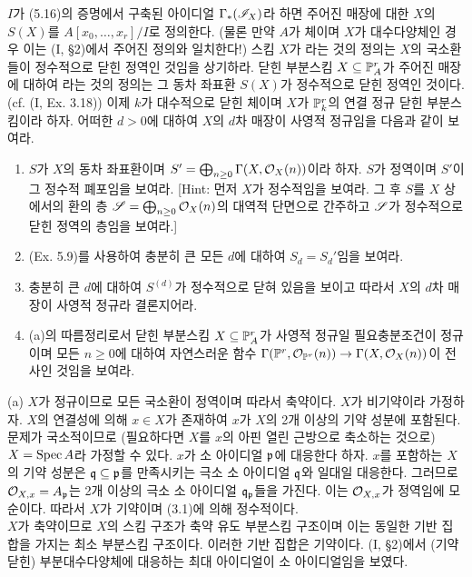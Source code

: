 \begin{enumerate}[label=\tb{5.\arabic*.},itemindent=0mm,itemsep=4mm]
	$I$가 (5.16)의 증명에서 구축된 아이디얼 $\Gamma_*(\mathscr{I}_X)$라 하면
	주어진 매장에 대한 $X$의  $S(X)$를 $A[x_0,\ldots,x_r]/I$로 정의한다.
	(물론 만약 $A$가 체이며 $X$가 대수다양체인 경우 이는 (I, \S 2)에서 주어진 정의와 일치한다!)
	스킴 $X$가 라는 것의 정의는 $X$의 국소환들이 정수적으로 닫힌 정역인 것임을 상기하라.
	닫힌 부분스킴 $X\subseteq\mathbb{P}^r_A$가 주어진 매장에 대하여 라는 것의 정의는
	그 동차 좌표환 $S(X)$가 정수적으로 닫힌 정역인 것이다. (cf. (I, Ex. 3.18))
	이제 $k$가 대수적으로 닫힌 체이며 $X$가 $\mathbb{P}^r_k$의 연결 정규 닫힌 부분스킴이라 하자.
	어떠한 $d>0$에 대하여 $X$의 $d$차 매장이 사영적 정규임을 다음과 같이 보여라.
	\begin{enumerate}[label=(\alph*)]
	\item $S$가 $X$의 동차 좌표환이며 $S'=\bigoplus_{n\ge 0}\Gamma(X,\mathcal{O}_X(n))$이라 하자.
	$S$가 정역이며 $S'$이 그 정수적 폐포임을 보여라. [Hint: 먼저 $X$가 정수적임을 보여라.
	그 후 $S$를 $X$ 상에서의 환의 층 $\mathscr{S}=\bigoplus_{n\ge 0}\mathcal{O}_X(n)$의 대역적 단면으로 간주하고
	$\mathscr{S}$가 정수적으로 닫힌 정역의 층임을 보여라.]
	\item (Ex. 5.9)를 사용하여 충분히 큰 모든 $d$에 대하여 $S_d=S_d'$임을 보여라.
	\item 충분히 큰 $d$에 대하여 $S^{(d)}$가 정수적으로 닫혀 있음을 보이고 따라서 $X$의 $d$차 매장이 사영적 정규라 결론지어라.
	\item (a)의 따름정리로서 닫힌 부분스킴 $X\subseteq\mathbb{P}^r_A$가 사영적 정규일 필요충분조건이 정규이며
	모든 $n\ge 0$에 대하여 자연스러운 함수 $\Gamma(\mathbb{P}^r,\mathcal{O}_{\mathbb{P}^r}(n))\rightarrow\Gamma(X,\mathcal{O}_X(n))$이 전사인 것임을 보여라.
	\end{enumerate}
	\sol (a) $X$가 정규이므로 모든 국소환이 정역이며 따라서 축약이다. $X$가 비기약이라 가정하자.
	$X$의 연결성에 의해 $x\in X$가 존재하여 $x$가 $X$의 2개 이상의 기약 성분에 포함된다.
	문제가 국소적이므로 (필요하다면 $X$를 $x$의 아핀 열린 근방으로 축소하는 것으로) $X=\operatorname{Spec} A$라 가정할 수 있다.
	$x$가 소 아이디얼 $\mathfrak{p}$에 대응한다 하자. $x$를 포함하는 $X$의 기약 성분은
	$\mathfrak{q}\subseteq\mathfrak{p}$를 만족시키는 극소 소 아이디얼 $\mathfrak{q}$와 일대일 대응한다.
	그러므로 $\mathcal{O}_{X,x}=A_{\mathfrak{p}}$는 2개 이상의 극소 소 아이디얼 $\mathfrak{q}_{\mathfrak{p}}$들을 가진다.
	이는 $\mathcal{O}_{X,x}$가 정역임에 모순이다. 따라서 $X$가 기약이며 (3.1)에 의해 정수적이다.\\
	$X$가 축약이므로 $X$의 스킴 구조가 축약 유도 부분스킴 구조이며 이는 동일한 기반 집합을 가지는 최소 부분스킴 구조이다.
	이러한 기반 집합은 기약이다. (I, \S 2)에서 (기약 닫힌) 부분대수다양체에 대응하는 최대 아이디얼이 소 아이디얼임을 보였다.

\end{enumerate}
